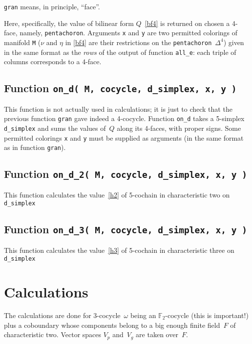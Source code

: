 \documentclass[12pt]{article}
\theoremstyle{definition}
\theoremstyle{remark}
\begin{document}
\texttt{gran} means, in principle, ``face''. 

Here, specifically, the value of bilinear form $Q$~\eqref{bf4} is returned on chosen a 4-face, namely, \texttt{pentachoron}. Arguments \texttt{x} and \texttt{y} are two permitted colorings of manifold \texttt{M} ($\nu$ and $\eta$ in \eqref{bf4} are their restrictions on the \texttt{pentachoron}~$\Delta^4$) given in the same format as the \emph{rows} of the output of function \texttt{all\_e}: each triple of columns corresponds to a 4-face.

\subsection{Function \texttt{on\_d( M, cocycle, d\_simplex, x, y )}}

This function is not actually used in calculations; it is just to check that the previous function \texttt{gran} gave indeed a 4-cocycle. Function \texttt{on\_d} takes a 5-simplex \texttt{d\_simplex} and sums the values of~$Q$ along its 4-faces, with proper signs. Some permitted colorings \texttt{x} and \texttt{y} must be supplied as arguments (in the same format as in function \texttt{gran}).

\subsection{Function \texttt{on\_d\_2( M, cocycle, d\_simplex, x, y )}}

This function calculates the value~\eqref{h2} of 5-cochain in characteristic two on \texttt{d\_simplex}

\subsection{Function \texttt{on\_d\_3( M, cocycle, d\_simplex, x, y )}}

This function calculates the value~\eqref{h3} of 5-cochain in characteristic three on \texttt{d\_simplex}



\section{Calculations}\label{s:calc}

The calculations are done for 3-cocycle~$\omega$ being an $\mathbb F_2$-cocycle (this is important!) plus a coboundary whose components belong to a big enough finite field~$F$ of characteristic two. Vector spaces $V_p$ and~$V_g$ are taken over~$F$.
\end{document}
